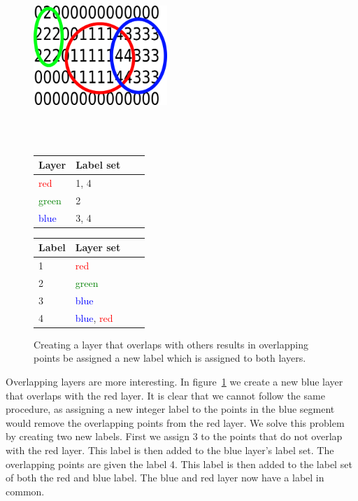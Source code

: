 \begin{figure}[ht]
	\begin{minipage}[b]{\linewidth}
		\centering
		\includegraphics[width=0.45\textwidth]{images/layers4}
	\end{minipage}
	\\\\
	\begin{minipage}[b]{0.46\linewidth}
		\hfill
		\begin{tabular}[b]{|l|l|l|l|}
			\hline
			Layer & Label set \\
			\hline
			\textcolor{red}{red}       & 1, 4 \\
			\textcolor{green}{green}       & 2 \\
			\textcolor{blue}{blue}       & 3, 4 \\
			\hline
		\end{tabular}
	\end{minipage}
	\hspace{0.5cm}
	\begin{minipage}[b]{0.5\linewidth}
		\begin{tabular}[b]{|l|l|l|l|}
			\hline
			Label & Layer set \\
			\hline
			1       & \textcolor{red}{red} \\
			2       & \textcolor{green}{green} \\
			3       & \textcolor{blue}{blue} \\
			4       & \textcolor{blue}{blue}, \textcolor{red}{red} \\
			\hline
		\end{tabular}
		\hfill
	\end{minipage}
	\caption[Three layers with one overlap]{Creating a layer that overlaps with others results in overlapping points be assigned a new label which is assigned to both layers.\label{fig:layer4}}
\end{figure}

Overlapping layers are more interesting. In figure~\ref{fig:layer4} we create a new blue layer that overlaps with the red layer. It is clear that we cannot follow the same procedure, as assigning a new integer label to the points in the blue segment would remove the overlapping points from the red layer. We solve this problem by creating two new labels. First we assign 3 to the points that do not overlap with the red layer. This label is then added to the blue layer's label set. The overlapping points are given the label 4. This label is then added to the label set of both the red and blue label. The blue and red layer now have a label in common.

